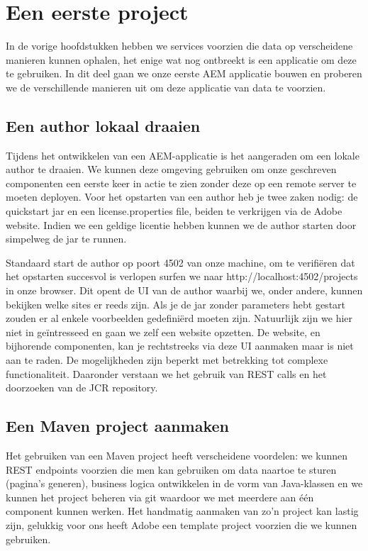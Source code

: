 \documentclass{article}
\begin{document}
	\section{Een eerste project}
	In de vorige hoofdstukken hebben we services voorzien die data op verscheidene manieren kunnen ophalen, het enige wat nog ontbreekt is een applicatie om deze te gebruiken. In dit deel gaan we onze eerste AEM applicatie bouwen en proberen we de verschillende manieren uit om deze applicatie van data te voorzien.
	\subsection{Een author lokaal draaien}
	Tijdens het ontwikkelen van een AEM-applicatie is het aangeraden om een lokale author te draaien. We kunnen deze omgeving gebruiken om onze geschreven componenten een eerste keer in actie te zien zonder deze op een remote server te moeten deployen. Voor het opstarten van een author heb je twee zaken nodig: de quickstart jar en een license.properties file, beiden te verkrijgen via de Adobe website. Indien we een geldige licentie hebben kunnen we de author starten door simpelweg de jar te runnen.
	\par
	Standaard start de author op poort 4502 van onze machine, om te verifi\"eren dat het opstarten succesvol is verlopen surfen we naar http://localhost:4502/projects in onze browser. Dit opent de UI van de author waarbij we, onder andere, kunnen bekijken welke sites er reeds zijn. Als je de jar zonder parameters hebt gestart zouden er al enkele voorbeelden gedefini\"erd moeten zijn. Natuurlijk zijn we hier niet in ge\"intresseed en gaan we zelf een website opzetten. De website, en bijhorende componenten, kan je rechtstreeks via deze UI aanmaken maar is niet aan te raden. De mogelijkheden zijn beperkt met betrekking tot complexe functionaliteit. Daaronder verstaan we het gebruik van REST calls en het doorzoeken van de JCR repository.
	
	\subsection{Een Maven project aanmaken}
		Het gebruiken van een Maven project heeft verscheidene voordelen: we kunnen REST endpoints voorzien die men kan gebruiken om data naartoe te sturen (pagina's generen), business logica ontwikkelen in de vorm van Java-klassen en we kunnen het project beheren via git waardoor we met meerdere aan één component kunnen werken. Het handmatig aanmaken van zo'n project kan lastig zijn, gelukkig voor ons heeft Adobe een template project voorzien die we kunnen gebruiken.
		
\end{document}
